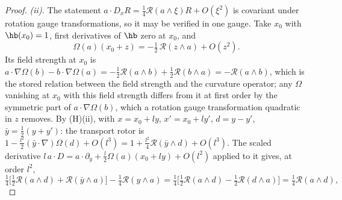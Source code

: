 \begin{proof}
\emph{(ii).} The statement $a\cdot D_{x}R = \tfrac14\mathcal{R}(a\wedge\xi)R + O(\xi^{2})$ is covariant under rotation gauge transformations, so it may be verified in one gauge. Take $x_{0}$ with $\hb(x_{0}) = 1$, first derivatives of $\hb$ zero at $x_{0}$, and
\[
\Omega(a)(x_{0} + z) = -\tfrac12\,\mathcal{R}(z\wedge a) + O(z^{2}) .
\]
Its field strength at $x_{0}$ is $a\cdot\nabla\Omega(b) - b\cdot\nabla\Omega(a) = -\tfrac12\mathcal{R}(a\wedge b) + \tfrac12\mathcal{R}(b\wedge a) = -\mathcal{R}(a\wedge b)$, which is the stored relation between the field strength and the curvature operator; any $\Omega$ vanishing at $x_{0}$ with this field strength differs from it at first order by the symmetric part of $a\cdot\nabla\Omega(b)$, which a rotation gauge transformation quadratic in $z$ removes. By (H)(ii), with $x = x_{0} + ly$, $x' = x_{0} + ly'$, $d = y - y'$, $\bar y = \tfrac12(y + y')$: the transport rotor is $1 - \tfrac{l^{2}}{2}(\bar y\cdot\nabla)\Omega(d) + O(l^{3}) = 1 + \tfrac{l^{2}}{4}\mathcal{R}(\bar y\wedge d) + O(l^{3})$. The scaled derivative $l\,a\cdot D = a\cdot\partial_{y} + \tfrac{l}{2}\Omega(a)(x_{0} + ly) + O(l^{2})$ applied to it gives, at order $l^{2}$,
\[
\tfrac14\bigl[\tfrac12\mathcal{R}(a\wedge d) + \mathcal{R}(\bar y\wedge a)\bigr] - \tfrac14\mathcal{R}(y\wedge a) = \tfrac14\bigl[\tfrac12\mathcal{R}(a\wedge d) - \tfrac12\mathcal{R}(d\wedge a)\bigr] = \tfrac14\mathcal{R}(a\wedge d),
\]

\end{proof}
